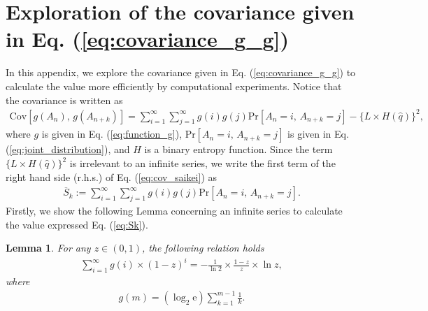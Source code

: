 \documentclass[dvipdfmx,english]{ampmt} %
\newtheorem{lemma}[theorem]{Lemma}
\begin{document}
\section{Exploration of the covariance given in Eq. (\ref{eq:covariance_g_g})}\label{appendix:B}
In this appendix, we explore the covariance given in Eq. (\ref{eq:covariance_g_g}) to calculate the value more efficiently by computational experiments. Notice that the covariance is written as 
\begin{align}\label{eq:cov_saikei}
	\mathrm{Cov}[g(A_n),\, g(A_{n+k})] 
	= \sum_{i=1}^{\infty} \sum_{j=1}^{\infty} g(i) g(j) \mathrm{Pr} \left[ A_n=i,\,A_{n+k}=j \right] - \{L\times H(\hat{q})\}^2,
\end{align}
where $g$ is given in Eq. (\ref{eq:function_g}), $\mathrm{Pr} \left[ A_n=i,\,A_{n+k}=j \right]$ is given in Eq. (\ref{eq:joint_distribution}), and $H$ is a binary entropy function.
%
Since the term $\{L\times H(\hat{q})\}^2$ is irrelevant to an infinite series, we write the first term of the right hand side (r.h.s.) of Eq. (\ref{eq:cov_saikei}) as
%
\begin{align}\label{eq:Sk}
	\overline{S}_{k} := \sum_{i=1}^{\infty} \sum_{j=1}^{\infty} g(i) g(j) \mathrm{Pr} \left[ A_n=i,\,A_{n+k}=j \right].
\end{align}
%
Firstly, we show the following Lemma concerning an infinite series to calculate the value expressed Eq. (\ref{eq:Sk}). 
%
\begin{lemma}\label{lemma:1}
For any $z \in (0,1)$, the following relation holds
\begin{align}\label{eq:infinite_series}
	\sum_{i=1}^{\infty} g(i) \times (1-z)^i = -\frac{1}{\ln 2} \times \frac{1-z}{z} \times \ln z,
\end{align}
where
\begin{align}
	g(m) = (\log_2 \mathrm{e}) \sum_{k=1}^{m-1} \frac{1}{k}.
\end{align}
\end{lemma}
\end{document}

